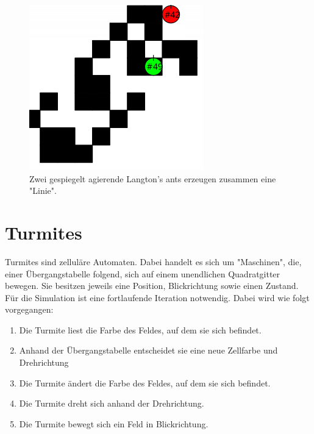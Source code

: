 \begin{figure}[!htb]
    \endminipage\hfill
      \includegraphics[width=\linewidth]{three.png}
    \endminipage

    \caption{Zwei gespiegelt agierende Langton's ants erzeugen zusammen eine "Linie".}
\end{figure}


\section{Turmites}
Turmites sind zelluläre Automaten. Dabei handelt es sich um "Maschinen", die, einer Übergangstabelle folgend, sich auf einem unendlichen Quadratgitter bewegen. Sie besitzen jeweils eine Position, Blickrichtung sowie einen Zustand. Für die Simulation ist eine fortlaufende Iteration notwendig. Dabei wird wie folgt vorgegangen:
\begin{enumerate}
    \item Die Turmite liest die Farbe des Feldes, auf dem sie sich befindet.
    \item Anhand der Übergangstabelle entscheidet sie eine neue Zellfarbe und Drehrichtung
    \item Die Turmite ändert die Farbe des Feldes, auf dem sie sich befindet.
    \item Die Turmite dreht sich anhand der Drehrichtung.
    \item Die Turmite bewegt sich ein Feld in Blickrichtung.
\end{enumerate}

